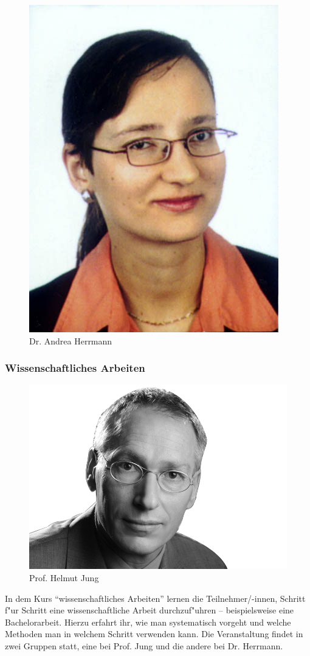 \begin{figure}[h]
  \centering
  \includegraphics[width=0.7\linewidth]{bilder/dozenten/Andrea.jpg}\\
  {Dr. Andrea Herrmann}
\end{figure}
\subsubsection{Wissenschaftliches Arbeiten}

\begin{figure}[h]
	\centering\includegraphics[width=0.9\linewidth]{bilder/dozenten/jung_frei.png}\\
	{Prof. Helmut Jung}
\end{figure}
In dem Kurs "`wissenschaftliches Arbeiten"' lernen die Teilnehmer/-innen, Schritt f"ur Schritt eine wissenschaftliche Arbeit durchzuf"uhren -- beispielsweise eine Bachelorarbeit.
Hierzu erfahrt ihr, wie man systematisch vorgeht und welche Methoden man in welchem Schritt verwenden kann.
Die Veranstaltung findet in zwei Gruppen statt, eine bei Prof. Jung und die andere bei Dr. Herrmann.

